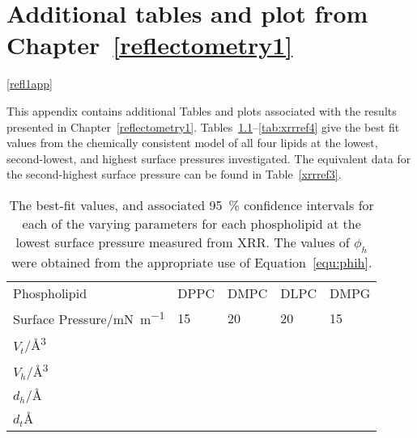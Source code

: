\chapter{Additional tables and plot from Chapter~\ref{reflectometry1}}

\ref{refl1app}

This appendix contains additional Tables and plots associated with the results presented in Chapter~\ref{reflectometry1}.
Tables~\ref{tab:xrrref1}--\ref{tab:xrrref4} give the best fit values from the chemically consistent model of all four lipids at the lowest, second-lowest, and highest surface pressures investigated. 
The equivalent data for the second-highest surface pressure can be found in Table~\ref{xrrref3}.
%
\begin{table}
    \centering
    \small
    \caption{The best-fit values, and associated \SI{95}{\percent} confidence intervals for each of the varying parameters for each phospholipid at the lowest surface pressure measured from XRR. The values of $\phi_h$ were obtained from the appropriate use of Equation~\protect\ref{equ:phih}.}
    \label{tab:xrrref1}
    \begin{tabular}{l | l l l l}
        \toprule
        Phospholipid & DPPC & DMPC & DLPC & DMPG \\
        Surface Pressure/\si{\milli\newton\per\meter} & 15 & 20 & 20 & 15 \\
        \midrule
        $V_t$/\si{\angstrom\cubed} &  &  &  &  \\
        $V_h$/\si{\angstrom\cubed} &  &  &  &  \\
        $d_h$/\si{\angstrom} &  &  &  &  \\
        \midrule
        $d_t$\si{\angstrom} &  &  &  &  \\

\end{tabular}
\end{table}
